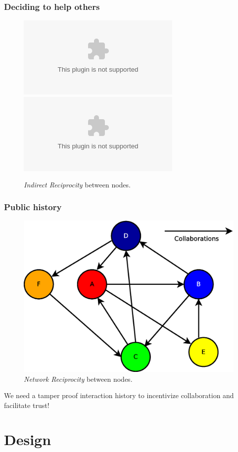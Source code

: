 \documentclass{beamer}
\begin{document}
\begin{frame}
\frametitle{Deciding to help others}
\begin{figure}
	\includegraphics<1,2,3>[scale=0.3]{images/problem/indirect-reciprocity-first.eps}
	\includegraphics<4->[scale=0.3]{images/problem/indirect-reciprocity.eps}
	\caption{\emph{Indirect Reciprocity} between nodes.}
	\label{fig:indirect-reciprocity}
\end{figure}
\end{frame}

\begin{frame}
\frametitle{Public history}
\begin{figure}
	\centerline{\includegraphics[scale=0.3]{images/problem/network-reciprocity.eps}}
	\caption{\emph{Network Reciprocity} between nodes.}
	\label{fig:network-reciprocity}
\end{figure}
\pause
We need a tamper proof interaction history to incentivize collaboration and facilitate trust!
\end{frame}

\section{Design}
\end{document}
